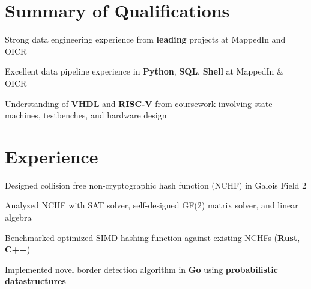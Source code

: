 \documentclass[]{chandan-cv}
\begin{document}
\hfill
\begin{minipage}[t]{0.75\textwidth}


\section{Summary of Qualifications}
\runsubsection{ }
\descript{ }
\location{ }
\vspace{\topsep} %
\begin{tightemize}
	\item Strong data engineering experience from \textbf{leading} projects at MappedIn and OICR
	\item Excellent data pipeline experience in \textbf{Python}, \textbf{SQL}, \textbf{Shell} at MappedIn \& OICR
	\item Understanding of \textbf{VHDL} and \textbf{RISC-V} from coursework involving 
	state machines, testbenches, and hardware design
\end{tightemize}
\sectionsep


\section{Experience}

\begin{tightemize}
        \item Designed collision free non-cryptographic hash function (NCHF) in Galois Field 2
        \item Analyzed NCHF with SAT solver, self-designed GF(2) matrix solver, and linear algebra
        \item Benchmarked optimized SIMD hashing function against existing NCHFs (\textbf{Rust}, \textbf{C++})
        \item Implemented novel border detection algorithm in \textbf{Go} using \textbf{probabilistic datastructures}
\end{tightemize}
\sectionsep


\end{minipage}
\end{document}
